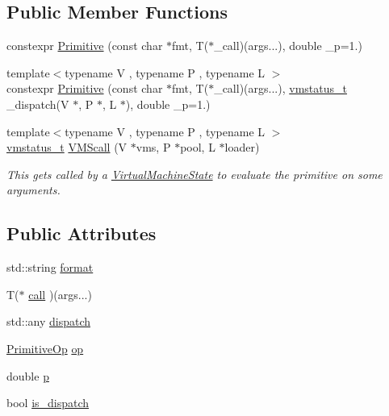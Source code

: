 \subsection*{Public Member Functions}
\begin{DoxyCompactItemize}
\item 
constexpr \hyperlink{struct_primitive_a582a781e02c86b17df208d6fc0c39daf}{Primitive} (const char $\ast$fmt, T($\ast$\+\_\+call)(args...), double \+\_\+p=1.)
\item 
{\footnotesize template$<$typename V , typename P , typename L $>$ }\\constexpr \hyperlink{struct_primitive_a8a9ad9e0b9c7bc94bbb4290cb298288c}{Primitive} (const char $\ast$fmt, T($\ast$\+\_\+call)(args...), \hyperlink{_instruction_8h_a6202215407ab29590bb936ca2996cf64}{vmstatus\+\_\+t} \+\_\+dispatch(V $\ast$, P $\ast$, L $\ast$), double \+\_\+p=1.)
\item 
{\footnotesize template$<$typename V , typename P , typename L $>$ }\\\hyperlink{_instruction_8h_a6202215407ab29590bb936ca2996cf64}{vmstatus\+\_\+t} \hyperlink{struct_primitive_a10cedec90ed4a3ff01be2bd3b9c36528}{V\+M\+Scall} (V $\ast$vms, P $\ast$pool, L $\ast$loader)
\begin{DoxyCompactList}\small\item\em This gets called by a \hyperlink{class_virtual_machine_state}{Virtual\+Machine\+State} to evaluate the primitive on some arguments. \end{DoxyCompactList}\end{DoxyCompactItemize}
\subsection*{Public Attributes}
\begin{DoxyCompactItemize}
\item 
std\+::string \hyperlink{struct_primitive_afa8c2d4087b36ae9580fed3dc00e47b6}{format}
\item 
T($\ast$ \hyperlink{struct_primitive_a4a183f50daf033866abc34fa2da9e703}{call} )(args...)
\item 
std\+::any \hyperlink{struct_primitive_a8fe52297e3da666ec08e2328a3fe92e9}{dispatch}
\item 
\hyperlink{_instruction_8h_a227278394efd1e2313c727102db09ea9}{Primitive\+Op} \hyperlink{struct_primitive_a45ef953a37468a97b5a4b5531e5f21ce}{op}
\item 
double \hyperlink{struct_primitive_a43fac47ebf8ec63a70443d80dcd04687}{p}
\item 
bool \hyperlink{struct_primitive_a599bf4b9b5115d99c203b51dc028ba4e}{is\+\_\+dispatch}
\end{DoxyCompactItemize}
